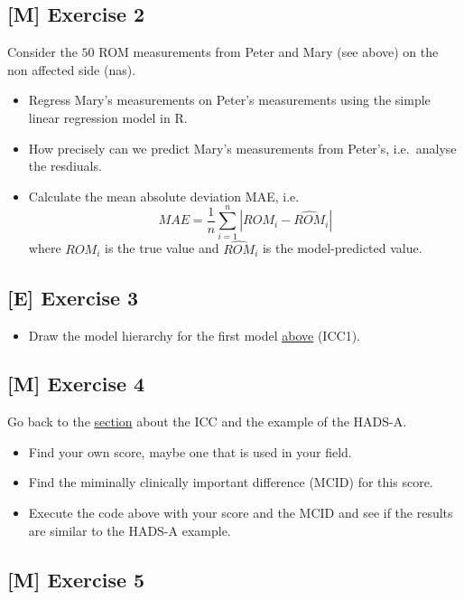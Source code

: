 \documentclass[
]{book}
\providecommand{\tightlist}{%
  \setlength{\itemsep}{0pt}\setlength{\parskip}{0pt}}
\begin{document}
\subsection{{[}M{]} Exercise 2}\label{exercise2}

Consider the \(50\) ROM measurements from Peter and Mary (see above) on the non affected side (nas).

\begin{itemize}
\tightlist
\item
  Regress Mary's measurements on Peter's measurements using the simple
  linear regression model in R.
\item
  How precisely can we predict Mary's measurements from Peter's, i.e.~analyse the resdiuals.
\item
  Calculate the mean absolute deviation MAE, i.e.~
  \[MAE = \frac{1}{n} \sum_{i=1}^n |ROM_i - \widehat{ROM}_i|\]
  where \(ROM_i\) is the true value and \(\widehat{ROM}_i\) is the model-predicted value.
\end{itemize}

\subsection{{[}E{]} Exercise 3}\label{exercise3}

\begin{itemize}
\tightlist
\item
  Draw the model hierarchy for the first model \hyperref[ICC]{above} (ICC1).
\end{itemize}

\subsection{{[}M{]} Exercise 4}\label{exercise4}

Go back to the \hyperref[badnews]{section} about the ICC and the example of the HADS-A.

\begin{itemize}
\tightlist
\item
  Find your own score, maybe one that is used in your field.
\item
  Find the miminally clinically important difference (MCID) for this score.
\item
  Execute the code above with your score and the MCID and see if
  the results are similar to the HADS-A example.
\end{itemize}

\subsection{{[}M{]} Exercise 5}\label{exercise5}
\end{document}
